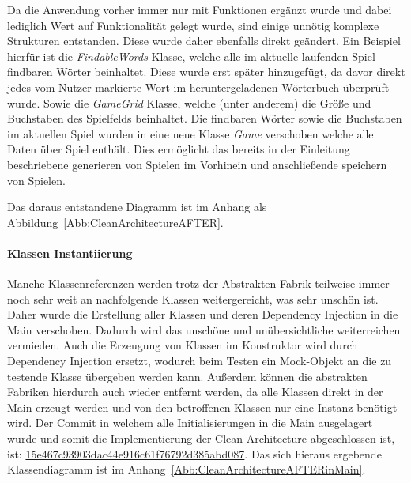 Da die Anwendung vorher immer nur mit Funktionen ergänzt wurde und dabei lediglich Wert auf Funktionalität gelegt wurde, sind einige unnötig komplexe Strukturen entstanden. Diese wurde daher ebenfalls direkt geändert.
Ein Beispiel hierfür ist die \textit{FindableWords} Klasse, welche alle im aktuelle laufenden Spiel findbaren Wörter beinhaltet. Diese wurde erst später hinzugefügt, da davor direkt jedes vom Nutzer markierte Wort im heruntergeladenen Wörterbuch überprüft wurde. Sowie die \textit{GameGrid} Klasse, welche (unter anderem) die Größe und Buchstaben des Spielfelds beinhaltet. Die findbaren Wörter sowie die Buchstaben im aktuellen Spiel wurden in eine neue Klasse \textit{Game} verschoben welche alle Daten über Spiel enthält. Dies ermöglicht das bereits in der Einleitung beschriebene generieren von Spielen im Vorhinein und anschließende speichern von Spielen.

Das daraus entstandene Diagramm ist im Anhang als Abbildung~\ref{Abb:CleanArchitectureAFTER}.


\paragraph{Klassen Instantiierung}
Manche Klassenreferenzen werden trotz der Abstrakten Fabrik teilweise immer noch sehr weit an nachfolgende Klassen \glqq weitergereicht\grqq, was sehr unschön ist. Daher wurde die Erstellung aller Klassen und deren Dependency Injection in die Main verschoben. Dadurch wird das unschöne und unübersichtliche weiterreichen vermieden. Auch die Erzeugung von Klassen im Konstruktor wird durch Dependency Injection ersetzt, wodurch beim Testen ein Mock-Objekt an die zu testende Klasse übergeben werden kann. Außerdem können die abstrakten Fabriken hierdurch auch wieder entfernt werden, da alle Klassen direkt in der Main erzeugt werden und von den betroffenen Klassen nur eine Instanz benötigt wird. Der Commit in welchem alle Initialisierungen in die Main ausgelagert wurde und somit die Implementierung der Clean Architecture abgeschlossen ist, ist: \href{https://github.com/EinToni/Wortfinder/commit/15e467c93903dac44e916c61f76792d385abd087}{15e467c93903dac44e916c61f76792d385abd087}. Das sich hieraus ergebende Klassendiagramm ist im Anhang~\ref{Abb:CleanArchitectureAFTERinMain}.


